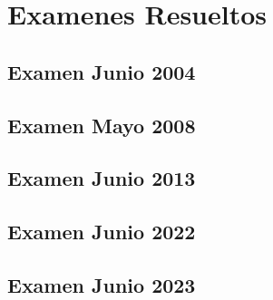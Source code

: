 \chapter{Examenes Resueltos}
\section{Examen Junio 2004}
  
\newpage
\section{Examen Mayo 2008}
  
\newpage
\section{Examen Junio 2013}
  
  
\section{Examen Junio 2022}
  

\section{Examen Junio 2023}
  

